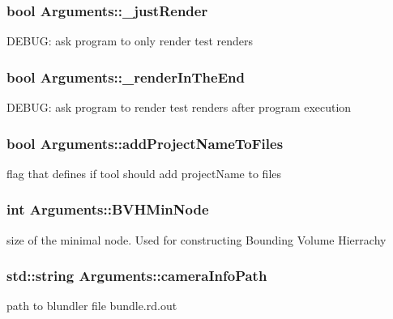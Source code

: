 \subsubsection[{\+\_\+just\+Render}]{\setlength{\rightskip}{0pt plus 5cm}bool Arguments\+::\+\_\+just\+Render}\label{struct_arguments_a425be50cc8828826b939677321ae98dc}
D\+E\+B\+U\+G\+: ask program to only render test renders \hypertarget{struct_arguments_ada75eb1bead23d95007b7a757050015e}{}
\subsubsection[{\+\_\+render\+In\+The\+End}]{\setlength{\rightskip}{0pt plus 5cm}bool Arguments\+::\+\_\+render\+In\+The\+End}\label{struct_arguments_ada75eb1bead23d95007b7a757050015e}
D\+E\+B\+U\+G\+: ask program to render test renders after program execution \hypertarget{struct_arguments_a5438dd5f419d88e72ba7dad3e7343229}{}
\subsubsection[{add\+Project\+Name\+To\+Files}]{\setlength{\rightskip}{0pt plus 5cm}bool Arguments\+::add\+Project\+Name\+To\+Files}\label{struct_arguments_a5438dd5f419d88e72ba7dad3e7343229}
flag that defines if tool should add project\+Name to files \hypertarget{struct_arguments_a90c008ddccf9fc27fc1e7db34b51b36e}{}
\subsubsection[{B\+V\+H\+Min\+Node}]{\setlength{\rightskip}{0pt plus 5cm}int Arguments\+::\+B\+V\+H\+Min\+Node}\label{struct_arguments_a90c008ddccf9fc27fc1e7db34b51b36e}
size of the minimal node. Used for constructing Bounding Volume Hierrachy \hypertarget{struct_arguments_a1efe0a7268bb4ab28a51566a13c5f36b}{}
\subsubsection[{camera\+Info\+Path}]{\setlength{\rightskip}{0pt plus 5cm}std\+::string Arguments\+::camera\+Info\+Path}\label{struct_arguments_a1efe0a7268bb4ab28a51566a13c5f36b}
path to blundler file \textquotesingle{}bundle.\+rd.\+out\textquotesingle{} \hypertarget{struct_arguments_a033abba738ba0403e87f883cc203d618}{}
